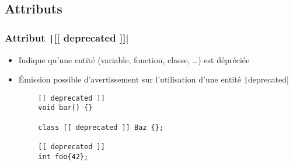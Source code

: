 \documentclass[C++.tex]{subfiles}
\begin{document}
\subsection*{Attributs}
\begin{frame}[fragile]
	\frametitle{Attribut \texttt|[[ deprecated ]]|}
	\begin{itemize}
		\item Indique qu'une entité (variable, fonction, classe, \ldots{}) est dépréciée
		\item Émission possible d'avertissement sur l'utilisation d'une entité \texttt|deprecated|

	\end{itemize}

	\begin{verbatim}
		[[ deprecated ]]
		void bar() {}

		class [[ deprecated ]] Baz {};

		[[ deprecated ]]
		int foo{42};
	\end{verbatim}

\end{frame}
\end{document}
